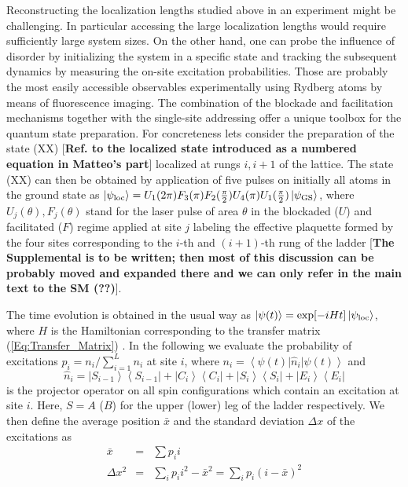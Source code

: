 \documentclass[prl,aps,twocolumn,showpacs,superscriptaddress,longbibliography]{revtex4-1}
\newcommand{\lan}{\left\langle}
\newcommand{\ran}{\right\rangle}
\newcommand{\ket}[1]{\left| #1 \ran}
\newcommand{\bra}[1]{\lan #1 \right|}
\begin{document}
Reconstructing the localization lengths studied above in an experiment might be challenging. In particular accessing the large localization lengths would require sufficiently large system sizes. On the other hand, one can probe the influence of disorder by initializing the system in a specific state and tracking the subsequent dynamics by measuring the on-site excitation probabilities. Those are probably the most easily accessible observables experimentally using Rydberg atoms by means of fluorescence imaging. The combination of the blockade and facilitation mechanisms together with the single-site addressing offer a unique toolbox for the quantum state preparation. For concreteness lets consider the preparation of the state (XX) [{\bf Ref. to the localized state introduced as a numbered equation in Matteo's part}] localized at rungs $i,i+1$ of the lattice. The state (XX) can then be obtained by application of five pulses on initially all atoms in the ground state as $\ket{\psi_{\rm loc}} = U_1(2 \pi) F_3(\pi) F_2(\frac{\pi}{2}) U_4(\pi) U_1(\frac{\pi}{2}) \ket{\psi_{\rm GS}}$, where $U_j(\theta),F_j(\theta)$ stand for the laser pulse of area $\theta$ in the blockaded ($U$) and facilitated ($F$) regime applied at site $j$ labeling the effective plaquette formed by the four sites corresponding to the $i$-th and $(i+1)$-th rung of the ladder \cite{SM} [{\bf The Supplemental is to be written; then most of this discussion can be probably moved and expanded there and we can only refer in the main text to the SM (??)}]. 

The time evolution is obtained in the usual way as $\ket{\psi(t)} = {\rm exp}[-i H t] \ket{\psi_{\rm loc}}$, where $H$ is the Hamiltonian corresponding to the transfer matrix (\ref{Eq:Transfer_Matrix}) \cite{SM}. In the following we evaluate the probability of excitations $p_i = n_i/\sum_{i=1}^{L} n_i$ at site $i$, where $n_i = \bra{\psi(t)} \hat{n}_i \ket{\psi(t)}$ and
\begin{equation}
	\hat{n}_i =
		\ket{S_{i-1}}\bra{S_{i-1}} + \ket{C_{i}}\bra{C_{i}} + \ket{S_{i}}\bra{S_{i}} + \ket{E_{i}}\bra{E_{i}}
\end{equation}
is the projector operator on all spin configurations which contain an excitation at site $i$. Here, $S=A$ ($B$) for the upper (lower) leg of the ladder respectively. We then define the average position $\bar{x}$ and the standard deviation $\Delta x$ of the excitations as
\begin{eqnarray}
	\bar{x} &=& \sum p_i i \\
	\Delta x^2 &=& \sum_i p_i i^2 - \bar{x}^2 = \sum_i p_i (i-\bar{x})^2
	\label{eq:Delta x}
\end{eqnarray}
\end{document}
